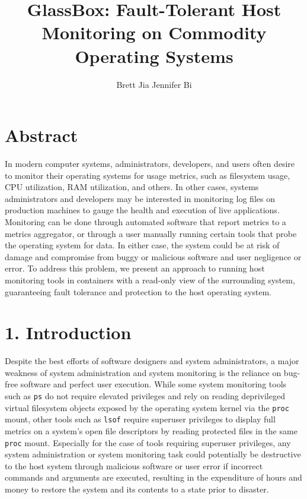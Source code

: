 \documentclass{proc}
\begin{document}
\title{GlassBox: Fault-Tolerant Host Monitoring on Commodity Operating Systems}

\author{Brett Jia \hspace{1em} Jennifer Bi}

\maketitle

\section*{Abstract}

In modern computer systems, administrators, developers, and users often desire to monitor their operating systems for usage metrics, such as filesystem usage, CPU utilization, RAM utilization, and others. In other cases, systems administrators and developers may be interested in monitoring log files on production machines to gauge the health and execution of live applications. Monitoring can be done through automated software that report metrics to a metrics aggregator, or through a user manually running certain tools that probe the operating system for data. In either case, the system could be at risk of damage and compromise from buggy or malicious software and user negligence or error. To address this problem, we present an approach to running host monitoring tools in containers with a read-only view of the surrounding system, guaranteeing fault tolerance and protection to the host operating system.

\section*{1. Introduction}

Despite the best efforts of software designers and system administrators, a major weakness of system administration and system monitoring is the reliance on bug-free software and perfect user execution. While some system monitoring tools such as \texttt{ps} do not require elevated privileges and rely on reading deprivileged virtual filesystem objects exposed by the operating system kernel via the \texttt{proc} mount, other tools such as \texttt{lsof} require superuser privileges to display full metrics on a system's open file descriptors by reading protected files in the same \texttt{proc} mount. Especially for the case of tools requiring superuser privileges, any system administration or system monitoring task could potentially be destructive to the host system through malicious software or user error if incorrect commands and arguments are executed, resulting in the expenditure of hours and money to restore the system and its contents to a state prior to disaster.
\end{document}
